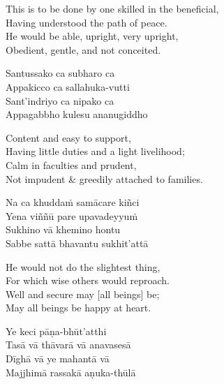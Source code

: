 \begin{english-verses}
  This is to be done by one skilled in the beneficial,\\
  Having understood the path of peace.\\
  He would be able, upright, very upright,\\
  Obedient, gentle, and not conceited.
\end{english-verses}

\begin{pali-hang-continued}
  Santussako ca subharo ca\\
  Appakicco ca sallahuka-vutti\\
  Sant'indriyo ca nipako ca\\
  Appagabbho kulesu ananugiddho
\end{pali-hang-continued}

\begin{english-verses}
  Content and easy to support,\\
  Having little duties and a light livelihood;\\
  Calm in faculties and prudent,\\
  Not impudent \& greedily attached to families.
\end{english-verses}

\begin{pali-hang-continued}
  Na ca khuddaṁ samācare kiñci\\
  Yena viññū pare upavadeyyuṁ\\
  Sukhino vā khemino hontu\\
  Sabbe sattā bhavantu sukhit'attā
\end{pali-hang-continued}

\begin{english-verses}
  He would not do the slightest thing,\\
  For which wise others would reproach.\\
  Well and secure may [all beings] be;\\
  May all beings be happy at heart.
\end{english-verses}

\begin{pali-hang-continued}
  Ye keci pāṇa-bhūt'atthi\\
  Tasā vā thāvarā vā anavasesā\\
  Dīghā vā ye mahantā vā\\
  Majjhimā rassakā aṇuka-thūlā
\end{pali-hang-continued}

